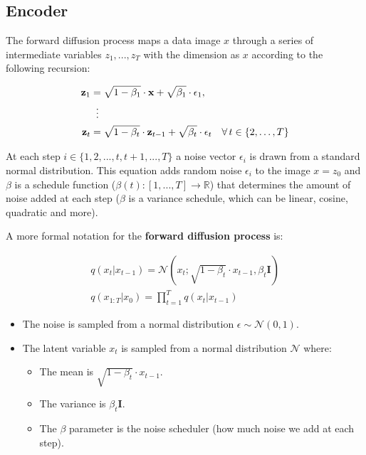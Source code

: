 \subsection{Encoder}

The forward diffusion process maps a data image $x$ through a series of intermediate variables $z_1, ..., z_T$ with the dimension as $x$ according to the following recursion:

\begin{equation}
    \begin{aligned}
    \mathbf{z}_1 &= \sqrt{1 - \beta_1} \cdot \mathbf{x} + \sqrt{\beta_1} \cdot \epsilon_1, \\
    &\;\;\vdots \notag \\
    \mathbf{z}_t &= \sqrt{1 - \beta_t} \cdot \mathbf{z}_{t-1} + \sqrt{\beta_t} \cdot \epsilon_t \quad \forall \, t \in \{2, \ldots, T\}
    \end{aligned}
\end{equation}

At each step $i \in \{1, 2, ..., t, t+1, ..., T\}$ a noise vector $\epsilon_i$ is drawn from a standard normal distribution. This equation adds random noise $\epsilon_i$ to the image $x = z_0$ and $\beta$ is a schedule function ($\beta(t):[1, ..., T] \rightarrow \mathbb{R}$) that determines the amount of noise added at each step ($\beta$ is a variance schedule, which can be linear, cosine, quadratic and more). 

A more formal notation for the \textbf{forward diffusion process} is:

\begin{equation*}
    \begin{aligned}
        q(x_t | x_{t-1}) = \mathcal{N}(x_t; \sqrt{1-\beta_t} \cdot x_{t-1}, \beta_t \mathbf{I}) \\
        q(x_{1:T} | x_0) = \prod_{t=1}^{T} q(x_t | x_{t-1})
    \end{aligned}
\end{equation*}

\begin{itemize}
    \item The noise is sampled from a normal distribution $\epsilon \sim \mathcal{N}(0, 1)$.
    \item The latent variable $x_t$ is sampled from a normal distribution $\mathcal{N}$ where:
    \begin{itemize}
        \item The mean is $\sqrt{1-\beta_t} \cdot x_{t-1}$.
        \item The variance is $\beta_t \mathbf{I}$.
        \item The $\beta$ parameter is the noise scheduler (how much noise we add at each step).
    \end{itemize}
\end{itemize}



